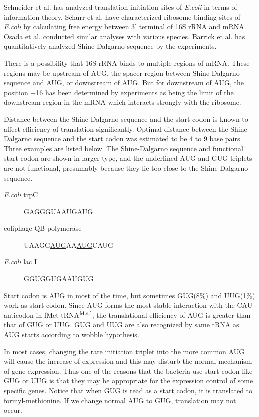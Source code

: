 Schneider et al.\cite{label11} has analyzed translation initiation
sites of {\it E.coli} in terms of information theory. Schurr et
al.\cite{label4700} have characterized ribosome binding sites of {\it
E.coli} by calculating free energy between 3' terminal of 16S rRNA and
mRNA.  Osada et al.\cite{arclabel_osada} conducted similar analyses
with various species.  Barrick et al.\cite{label28} has quantitatively
analyzed Shine-Dalgarno sequence by the experiments.  

There is a possibility that 16S rRNA binds to multiple regions of
mRNA. These regions may be upstream of AUG, the spacer region between
Shine-Dalgarno sequence and AUG, or downstream of AUG\cite{label10}.
But for downstream of AUG, the position +16 has been determined by
experiments as being the limit of the downstream region in the mRNA
which interacts strongly with the ribosome.

Distance between the Shine-Dalgarno sequence and the start codon is
known to affect efficiency of translation significantly. Optimal
distance between the Shine-Dalgarno sequence and the start codon was
estimated to be 4 to 9 base pairs\cite{label9}.  Three examples are
listed below. The Shine-Dalgarno sequence and functional start
codon are shown in larger type, and the underlined AUG and GUG
triplets are not functional, presumably because they lie too close to
the Shine-Dalgarno sequence\cite{label22}.


\begin{description}
\item[{\it E.coli} trpC]  {\large GAGG}GUA\underline{AUG}{\large AUG}
\item[coliphage QB polymerase]
{\large UAAGG\underline{A}}\underline{UG}AA\underline{AUG}C{\large AUG} 
\item[{\it E.coli} lac I] 
{\large G\underline{GUG}}\underline{GUG}A\underline{AU{\large G}}{\large UG}
\end{description}


Start codon is AUG in most of the time, but sometimes GUG(8\%) and
UUG(1\%) work as start codon. Since AUG forms the most stable
interaction with the CAU anticodon in fMet-tRNA$^{\rm Metf}$, the
translational efficiency of AUG is greater than that of GUG or
UUG. GUG and UUG are also recognized by same tRNA as AUG starts
according to wobble hypothesis\cite{label1020}.

In most cases, changing the rare initiation triplet
into the more common AUG will cause the increase of expression and this
may disturb the normal mechanism of gene expression. Thus one of the reasons
that the bacteria use start codon like GUG or UUG is that they may be
appropriate for the expression control of some specific genes. Notice that
when GUG is read as a start codon, it is translated to formyl-methionine.
If we change normal AUG to GUG, translation may not occur.



